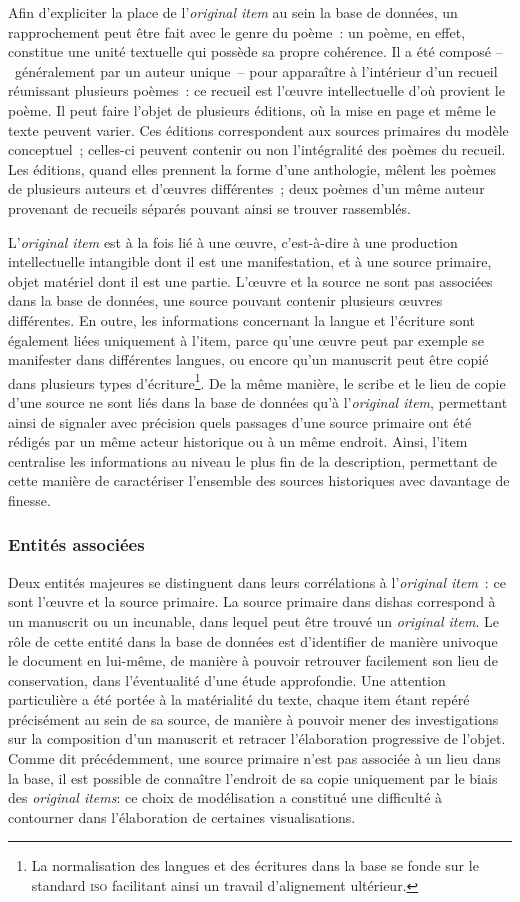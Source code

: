 \documentclass[a4paper,12pt,twoside]{book}
\newcommand{\eng}{\emph}
\newcommand{\oi}{\eng{original item}\xspace}
\newcommand{\ois}{\eng{original items}\xspace}
\newcommand{\dishas}{\gls{dishas}\xspace}
\begin{document}
Afin d'expliciter la place de l'\oi au sein la base de données, un rapprochement peut être fait avec le genre du poème~: un poème, en effet, constitue une unité textuelle qui possède sa propre cohérence. Il a été composé –~généralement par un auteur unique~– pour apparaître à l'intérieur d'un recueil réunissant plusieurs poèmes~: ce recueil est l'œuvre intellectuelle d'où provient le poème. Il peut faire l'objet de plusieurs éditions, où la mise en page et même le texte peuvent varier. Ces éditions correspondent aux sources primaires du modèle conceptuel~; celles-ci peuvent contenir ou non l'intégralité des poèmes du recueil. Les éditions, quand elles prennent la forme d'une anthologie, mêlent les poèmes de plusieurs auteurs et d'œuvres différentes~; deux poèmes d'un même auteur provenant de recueils séparés pouvant ainsi se trouver rassemblés.

L'\oi est à la fois lié à une œuvre, c'est-à-dire à une production intellectuelle intangible dont il est une manifestation, et à une source primaire, objet matériel dont il est une partie. L'œuvre et la source ne sont pas associées dans la base de données, une source pouvant contenir plusieurs œuvres différentes. En outre, les informations concernant la langue et l'écriture sont également liées uniquement à l'item, parce qu'une œuvre peut par exemple se manifester dans différentes langues, ou encore qu'un manuscrit peut être copié dans plusieurs types d'écriture\footnote{La normalisation des langues et des écritures dans la base se fonde sur le standard \textsc{iso} facilitant ainsi un travail d'alignement ultérieur.}. De la même manière, le scribe et le lieu de copie d'une source ne sont liés dans la base de données qu'à l'\oi, permettant ainsi de signaler avec précision quels passages d'une source primaire ont été rédigés par un même acteur historique ou à un même endroit. Ainsi, l'item centralise les informations au niveau le plus fin de la description, permettant de cette manière de caractériser l'ensemble des sources historiques avec davantage de finesse.

			\subsubsection{Entités associées}
Deux entités majeures se distinguent dans leurs corrélations à l'\oi~: ce sont l'œuvre et la source primaire. La source primaire dans \dishas correspond à un manuscrit ou un incunable, dans lequel peut être trouvé un \oi. Le rôle de cette entité dans la base de données est d'identifier de manière univoque le document en lui-même, de manière à pouvoir retrouver facilement son lieu de conservation, dans l'éventualité d'une étude approfondie. Une attention particulière a été portée à la matérialité du texte, chaque item étant repéré précisément au sein de sa source, de manière à pouvoir mener des investigations sur la composition d'un manuscrit et retracer l'élaboration progressive de l'objet. Comme dit précédemment, une source primaire n'est pas associée à un lieu dans la base, il est possible de connaître l'endroit de sa copie uniquement par le biais des \ois: ce choix de modélisation a constitué une difficulté à contourner dans l'élaboration de certaines visualisations.
\end{document}
